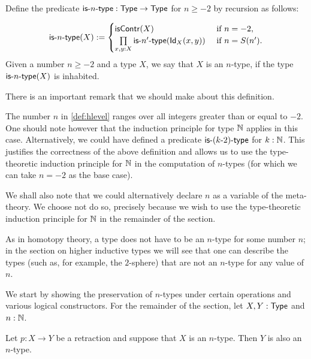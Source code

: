 \begin{defn}\label{def:hlevel}
  Define the predicate $\istype{n} : \Type \to \Type$ for $n \geq -2$ by recursion as follows:

\[ \istype{n}(X) := \begin{cases}
                         \iscontr(X) & \text{ if } n = -2 , \\
                         \prod\limits_{x,y : X}\istype{n'}(\idtype[X]{x}{y}) & \text{ if } n = S(n') .
                        \end{cases}
\]
%
Given a number $n \geq -2$ and a type $X$, we say that $X$ is an $n$-type, if the type $\istype{n}(X)$ is inhabited.
\end{defn}

There is an important remark that we should make about this definition.

\begin{rmk}
 The number $n$ in \autoref{def:hlevel} ranges over all integers greater than or equal to $-2$. One should note however that the induction principle for type $\Nat$ applies in this case.  Alternatively, we could have defined a predicate $\istype{(k\mbox{-}2)}$ for $k : \Nat$. This justifies the correctness of the above definition and allows us to use the type-theoretic induction principle for $\Nat$ in the computation of $n$-types (for which we can take $n = -2$ as the base case).
 
 We shall also note that we could alternatively declare $n$ as a variable of the meta-theory. We choose not do so, precisely because we
wish to use the type-theoretic induction principle for $\Nat$ in the remainder of the section.
\end{rmk}

As in homotopy theory, a type does not have to be an $n$-type for some number $n$; in the section on higher inductive types we will see that one can describe the types (such as, for example, the $2$-sphere) that are not an $n$-type for any value of $n$.

We start by showing the preservation of $n$-types under certain operations and various logical constructors.
For the remainder of the section, let $X, Y : \Type$ and $n : \Nat$.
\begin{thm}\label{thm:h-level-retracts}
 Let $p \colon X \to Y$ be a retraction and suppose that $X$ is an $n$-type. Then $Y$ is also an $n$-type.
\end{thm}

